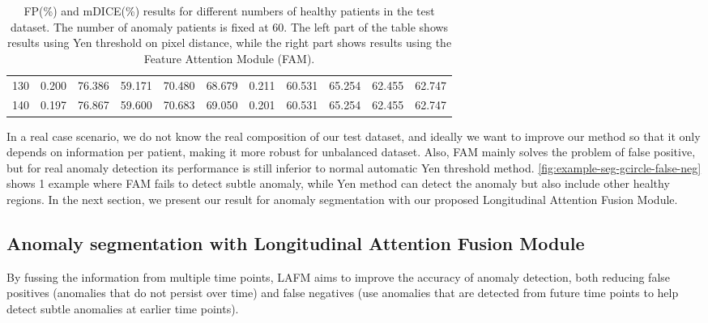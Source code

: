 \begin{table}[htbp]
{\begin{tabular}{lrrrrrrrrrr}
    130 & 0.200 & 76.386 & 59.171 & 70.480 & 68.679 & 0.211 & 60.531 & 65.254 & 62.455 & 62.747 \\
    140 & 0.197 & 76.867 & 59.600 & 70.683 & 69.050 & 0.201 & 60.531 & 65.254 & 62.455 & 62.747 \\
    \bottomrule
    \end{tabular}%
    }
    \caption[FP\% and DICE\% for different compositions of test dataset]{FP(\%) and mDICE(\%) results for different numbers of healthy patients in the test dataset. The number of anomaly patients is fixed at 60. The left part of the table shows results using Yen threshold on pixel distance, while the right part shows results using the Feature Attention Module (FAM).}
    \label{tab:fp-mdice-nb-healthy}
\end{table}

In a real case scenario, we do not know the real composition of our test dataset, and ideally we want to improve our method so that it only depends on information per patient, making it more robust for unbalanced dataset. Also, FAM mainly solves the problem of false positive, but for real anomaly detection its performance is still inferior to normal automatic Yen threshold method. \cref{fig:example-seg-gcircle-false-neg} shows 1 example where FAM fails to detect subtle anomaly, while Yen method can detect the anomaly but also include other healthy regions. In the next section, we present our result for anomaly segmentation with our proposed Longitudinal Attention Fusion Module. 

\subsection{Anomaly segmentation with Longitudinal Attention Fusion Module}
By fussing the information from multiple time points, \ac{LAFM} aims to improve the accuracy of anomaly detection, both reducing false positives (anomalies that do not persist over time) and false negatives (use anomalies that are detected from future time points to help detect subtle anomalies at earlier time points).

